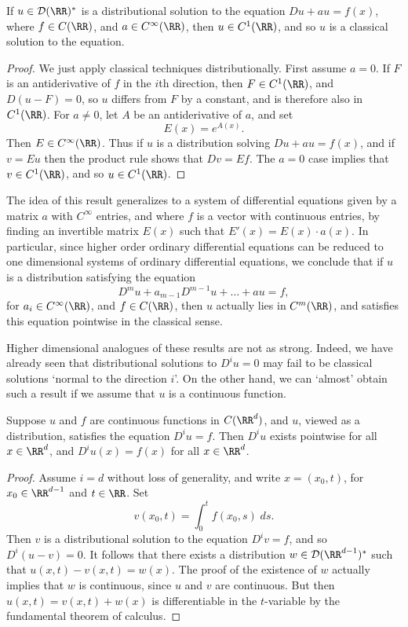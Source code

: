\begin{lemma}
    If $u \in \mathcal{D}(\RR)^*$ is a distributional solution to the equation $D u + a u = f(x)$, where $f \in C(\RR)$, and $a \in C^\infty(\RR)$, then $u \in C^1(\RR)$, and so $u$ is a classical solution to the equation.
\end{lemma}
\begin{proof}
    We just apply classical techniques distributionally. First assume $a = 0$. If $F$ is an antiderivative of $f$ in the $i$th direction, then $F \in C^1(\RR)$, and $D(u - F) = 0$, so $u$ differs from $F$ by a constant, and is therefore also in $C^1(\RR)$. For $a \neq 0$, let $A$ be an antiderivative of $a$, and set
    \[ E(x) = e^{A(x)}. \]
    Then $E \in C^\infty(\RR)$. Thus if $u$ is a distribution solving $D u + a u = f(x)$, and if $v = E u$ then the product rule shows that $Dv = Ef$. The $a = 0$ case implies that $v \in C^1(\RR)$, and so $u \in C^1(\RR)$.
\end{proof}

\begin{remark}
    The idea of this result generalizes to a system of differential equations given by a matrix $a$ with $C^\infty$ entries, and where $f$ is a vector with continuous entries, by finding an invertible matrix $E(x)$ such that $E'(x) = E(x) \cdot a(x)$. In particular, since higher order ordinary differential equations can be reduced to one dimensional systems of ordinary differential equations, we conclude that if $u$ is a distribution satisfying the equation
    \[ D^m u + a_{m-1} D^{m-1} u + \dots + au = f, \]
    for $a_i \in C^\infty(\RR)$, and $f \in C(\RR)$, then $u$ actually lies in $C^m(\RR)$, and satisfies this equation pointwise in the classical sense.
\end{remark}

Higher dimensional analogues of these results are not as strong. Indeed, we have already seen that distributional solutions to $D^i u = 0$ may fail to be classical solutions `normal to the direction $i$'. On the other hand, we can `almost' obtain such a result if we assume that $u$ is a continuous function.

\begin{lemma}
    Suppose $u$ and $f$ are continuous functions in $C(\RR^d)$, and $u$, viewed as a distribution, satisfies the equation $D^i u = f$. Then $D^i u$ exists pointwise for all $x \in \RR^d$, and $D^i u (x) = f(x)$ for all $x \in \RR^d$.
\end{lemma}
\begin{proof}
    Assume $i = d$ without loss of generality, and write $x = (x_0,t)$, for $x_0 \in \RR^{d-1}$ and $t \in \RR$. Set
    \[ v(x_0,t) = \int_0^t f(x_0,s)\; ds. \]
    Then $v$ is a distributional solution to the equation $D^i v = f$, and so $D^i(u - v) = 0$. It follows that there exists a distribution $w \in \mathcal{D}(\RR^{d-1})^*$ such that $u(x,t) - v(x,t) = w(x)$. The proof of the existence of $w$ actually implies that $w$ is continuous, since $u$ and $v$ are continuous. But then $u(x,t) = v(x,t) + w(x)$ is differentiable in the $t$-variable by the fundamental theorem of calculus.
\end{proof}

